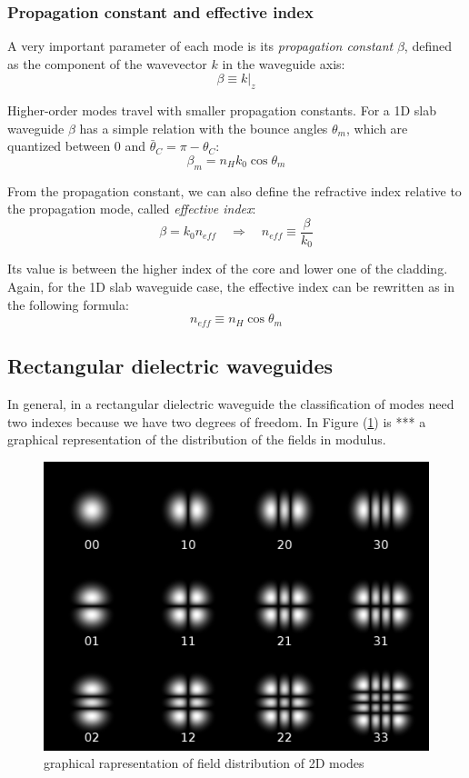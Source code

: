 \documentclass[12pt,a4paper,twoside]{article}
\begin{document}
\subsubsection*{Propagation constant and effective index}

A very important parameter of each mode is its \textit{propagation constant} $\beta$, defined as the component of the wavevector $k$ in the waveguide axis:
\begin{equation}
\beta \equiv k|_z
\end{equation}

Higher-order modes travel with smaller propagation constants.
For a 1D slab waveguide $\beta$ has a simple relation with the bounce angles $\theta_m$, which are quantized between $0$ and $\bar{\theta}_C = \pi - \theta_C$:
$$\beta_m = n_H k_0 \cos \theta_m$$

From the propagation constant, we can also define the refractive index relative to the propagation mode, called \textit{effective index}:
\begin{equation}
\beta = k_0 n_{eff} \quad \Rightarrow \quad n_{eff} \equiv \frac{\beta}{k_0}
\end{equation}

Its value is between the higher index of the core and lower one of the cladding.
Again, for the 1D slab waveguide case, the effective index can be rewritten as in the following formula:
$$ n_{eff} \equiv n_H \cos \theta_m$$

\subsection{Rectangular dielectric waveguides}
In general, in a rectangular dielectric waveguide the classification of modes need two indexes because we have two degrees of freedom.
In Figure (\ref{fig_2dmodes}) is *** a graphical representation of the distribution of the fields in modulus.

\begin{figure}[ht]
	\centering
	\includegraphics[width=.5\textwidth]{2Dmodes.png}
	\caption{graphical rapresentation of field distribution of 2D modes}
	\label{fig_2dmodes}
\end{figure}
\end{document}
